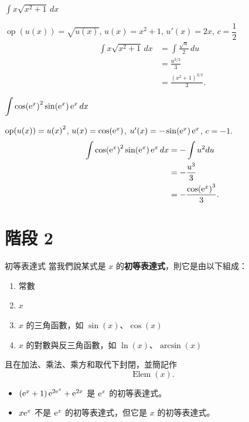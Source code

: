 \documentclass{beamer}
\newcommand{\Left} {\mathopen{}\mathclose\bgroup\left}
\newcommand{\Right}{\aftergroup\egroup\right}
\newcommand{\e}{\textup e}
\newcommand{\op}  {\operatorname{op}}
\newcommand{\Elem}{\operatorname{Elem}}
\theoremstyle{remark}
\begin{document}
\begin{CJK}{UTF8}{bsmi}
\begin{frame}{$\displaystyle \int x \sqrt{x^2+1}\,dx$}
  \begin{solution}
    $\op(u(x)) = \sqrt{u(x)}$, $u(x) = x^2+1$, $u'(x) = 2x$, $c = \dfrac12$
    \begin{align*}
      \int x \sqrt{x^2+1}\,dx &= \int \frac{\sqrt u}{2}\,du\\
	&= \frac{u^{3/2}}{3}\\
	&= \frac{\left( x^2 + 1 \right)^{3/2}}{3}.
    \end{align*}
  \end{solution}
\end{frame}

\begin{frame}{$\displaystyle \int \cos \Left( \e^x \Right)^2 \sin(\e^x)\,\e^x\,dx$}
  \begin{solution}
    $\op(u(x)) = u \Left( x \Right)^2$, $u(x) = \cos(\e^x)$, $u'(x) = -\sin(\e^x)\,\e^x$, $c = -1$.
    \begin{align*}
      \int \cos \Left( \e^x \Right)^2 \sin(\e^x)\,\e^x\,dx &= -\int u^2 du\\
	&= -\frac{u^3}{3}\\
	&= -\frac{\cos \Left( \e^x \Right)^3}{3}.
    \end{align*}
  \end{solution}
\end{frame}

\section{階段 2}
\begin{frame}{初等表達式}
  當我們說某式是 $x$ 的\textbf{初等表達式}，則它是由以下組成：
  \begin{enumerate}
    \item 常數
    \item $x$
    \item $x$ 的三角函數，如 $\sin(x)$、$\cos(x)$
    \item $x$ 的對數與反三角函數，如 $\ln(x)$、$\arcsin(x)$
  \end{enumerate}
  且在加法、乘法、乘方和取代下封閉，並簡記作
  \[\Elem(x).\]
  \begin{example}
    \begin{itemize}
      \item $\left( \e^x + 1 \right) \e^{2\e^x} + \e^{2x}$ 是 $\e^x$ 的初等表達式。
      \item $x\e^x$ 不是 $\e^x$ 的初等表達式，但它是 $x$ 的初等表達式。
    \end{itemize}
  \end{example}
\end{frame}


\end{CJK}
\end{document}
